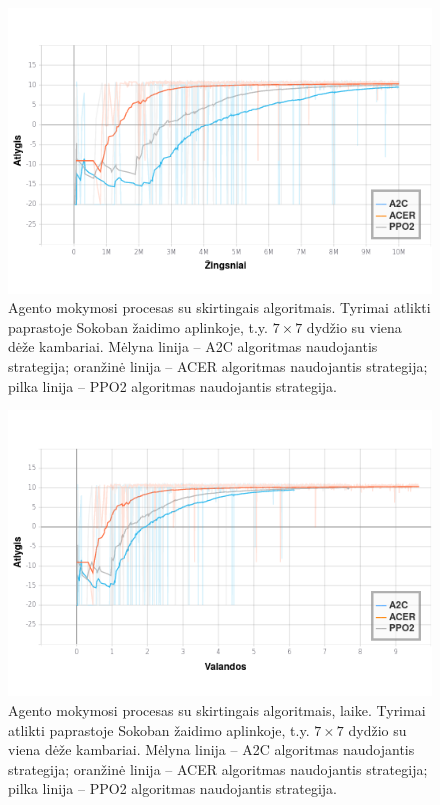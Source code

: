 \documentclass{VUMIFPSbakalaurinis}
\begin{document}
{	\begin{figure}[H]
		\centering
		\includegraphics[scale=0.75]{img/graphs/algorithms}
		\caption{Agento mokymosi procesas su skirtingais algoritmais. Tyrimai atlikti paprastoje Sokoban žaidimo aplinkoje, t.y. \(7 \times 7\) dydžio su viena dėže kambariai. Mėlyna linija -- A2C algoritmas naudojantis  strategija; oranžinė linija -- ACER algoritmas naudojantis  strategija; pilka linija -- PPO2 algoritmas naudojantis  strategija.}
		\label{img:algorithms_graph}
	\end{figure}
	\begin{figure}[H]
		\centering
		\includegraphics[scale=0.75]{img/graphs/algorithms_time}
		\caption{Agento mokymosi procesas su skirtingais algoritmais, laike. Tyrimai atlikti paprastoje Sokoban žaidimo aplinkoje, t.y. \(7 \times 7\) dydžio su viena dėže kambariai. Mėlyna linija -- A2C algoritmas naudojantis  strategija; oranžinė linija -- ACER algoritmas naudojantis  strategija; pilka linija -- PPO2 algoritmas naudojantis  strategija.}
		\label{img:algorithms_time_graph}
	\end{figure}
}
\end{document}
